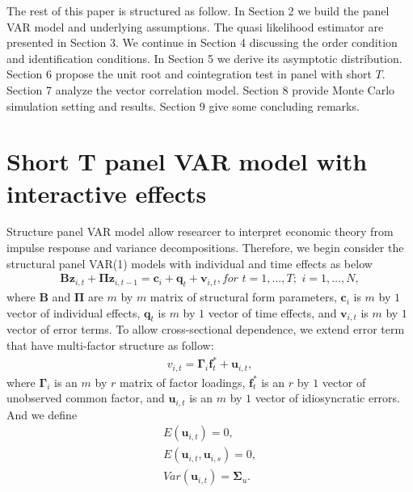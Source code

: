 \documentclass[12pt,a4paper,hyperref]{article}
\begin{document}
The rest of this paper is structured as follow. In Section 2 we build the panel VAR model and underlying assumptions. The quasi likelihood estimator are presented in Section 3. We continue in Section 4 discussing the order condition and identification conditions. In Section 5 we derive its asymptotic distribution. Section 6 propose the unit root and cointegration test in panel with short $T$. Section 7 analyze the vector correlation model. Section 8 provide Monte Carlo simulation setting and results. Section 9 give some concluding remarks.







\section{Short T panel VAR model with interactive effects}
Structure panel VAR model allow researcer to interpret economic theory from impulse response  and variance decompositions.
Therefore,  we begin consider the structural panel VAR(1) models with individual and time effects as below
\begin{align}
\boldsymbol{B}\boldsymbol{z}_{i,t}+\boldsymbol{\Pi}\boldsymbol{z}_{i,t-1}=\boldsymbol{c}_{i}+\boldsymbol{q}_{t}+\boldsymbol{v}_{i,t}, for \,\, t=1,\ldots, T;\,\,i=1,\ldots,N, \label{1.1}
\end{align}
where $\boldsymbol{B}$ and $\boldsymbol{\Pi}$ are $m$ by $m$ matrix of structural form parameters, $\boldsymbol{c}_{i}$ is $m$ by $1$ vector of individual effects, $\boldsymbol{q}_{t}$ is $m$ by $1$ vector of time effects, and $\boldsymbol{v}_{i,t}$  is $m$ by $1$ vector of error terms.  To allow cross-sectional dependence, we  extend error term that have multi-factor structure as follow:
\begin{align}
v_{i,t}=\boldsymbol{\Gamma}_{i}\boldsymbol{f}^{\ast}_{t}+\boldsymbol{u}_{i,t},
\end{align}
where  $\boldsymbol{\Gamma}_{i}$ is an $m$ by $r$ matrix of factor loadings, $\boldsymbol{f}^{\ast}_{t}$ is an $r$ by $1$ vector of unobserved common factor, and $\boldsymbol{u}_{i,t}$ is an $m$ by $1$ vector of idiosyncratic errors.
And we define
\begin{align}
E(\boldsymbol{u}_{i,t})=0, \\
E(\boldsymbol{u}_{i,t}, \boldsymbol{u}_{i,s})=0, \\
Var(\boldsymbol{u}_{i,t})=\boldsymbol{\Sigma}_{u}.
\end{align}
\end{document}
